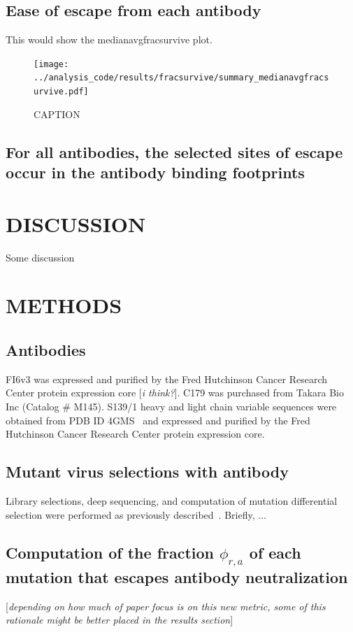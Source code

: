 \documentclass[11pt]{article}
\newcommand{\comment}[1]{{\color{red}[\textsl{#1}]}}
\begin{document}
\subsection*{Ease of escape from each antibody}
This would show the medianavgfracsurvive plot.

\begin{figure}
\centerline{\texttt{[image: ../analysis\_code/results/fracsurvive/summary\_medianavgfracsurvive.pdf]}}
\caption{
CAPTION
}
\end{figure}

\subsection*{For all antibodies, the selected sites of escape occur in the antibody binding footprints}

\section*{DISCUSSION}
Some discussion

\clearpage

\section*{METHODS}
\subsection*{Antibodies}
FI6v3 was expressed and purified by the Fred Hutchinson Cancer Research Center protein expression core \comment{i think?}.
C179 was purchased from Takara Bio Inc (Catalog \# M145).
S139/1 heavy and light chain variable sequences were obtained from PDB ID 4GMS~\cite{lee2012heterosubtypic} and expressed and purified by the Fred Hutchinson Cancer Research Center protein expression core.

\subsection*{Mutant virus selections with antibody}
Library selections, deep sequencing, and computation of mutation differential selection were performed as previously described~\cite{doud2017complete}. Briefly, ...

\subsection*{Computation of the fraction $\phi_{r,a}$ of each mutation that escapes antibody neutralization}
\comment{depending on how much of paper focus is on this new metric, some of this rationale might be better placed in the results section}
\end{document}
